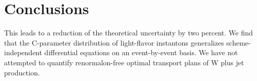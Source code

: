 \section{Conclusions}\label{sec:conclusions}

This leads to a reduction of the theoretical uncertainty by two percent.
We find that the C-parameter distribution of light-flavor instantons
generalizes scheme-independent differential equations on an
event-by-event basis. We have not attempted to quantify renormalon-free
optimal transport plans of W plus jet production.

